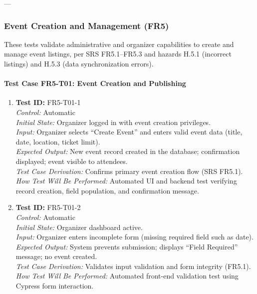 \documentclass[12pt, titlepage]{article}
\begin{document}
---

\subsubsection{Event Creation and Management (FR5)}

These tests validate administrative and organizer capabilities to create and manage event listings,
per SRS FR5.1–FR5.3 and hazards H.5.1 (incorrect listings) and H.5.3 (data synchronization errors).

\paragraph{Test Case FR5-T01: Event Creation and Publishing}

\begin{enumerate}\setlength{\itemsep}{1em}
    \item \textbf{Test ID:} FR5-T01-1\\[0.5em]
    \textit{Control:} Automatic\\[0.3em]
    \textit{Initial State:} Organizer logged in with event creation privileges.\\[0.3em]
    \textit{Input:} Organizer selects “Create Event” and enters valid event data (title, date, location, ticket limit).\\[0.3em]
    \textit{Expected Output:} New event record created in the database; confirmation displayed; event visible to attendees.\\[0.3em]
    \textit{Test Case Derivation:} Confirms primary event creation flow (SRS FR5.1).\\[0.3em]
    \textit{How Test Will Be Performed:} Automated UI and backend test verifying record creation, field population, and confirmation message.

    \item \textbf{Test ID:} FR5-T01-2\\[0.5em]
    \textit{Control:} Automatic\\[0.3em]
    \textit{Initial State:} Organizer dashboard active.\\[0.3em]
    \textit{Input:} Organizer enters incomplete form (missing required field such as date).\\[0.3em]
    \textit{Expected Output:} System prevents submission; displays “Field Required” message; no event created.\\[0.3em]
    \textit{Test Case Derivation:} Validates input validation and form integrity (FR5.1).\\[0.3em]
    \textit{How Test Will Be Performed:} Automated front-end validation test using Cypress form interaction.


\end{enumerate}
\end{document}

